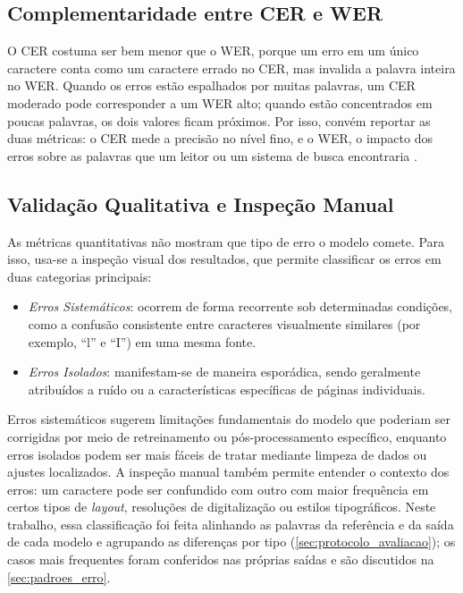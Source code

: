 \documentclass[noabntexcite,oneside]{ufsc-thesis-rn46-2019}
\begin{document}
\subsection{Complementaridade entre CER e WER}

O CER costuma ser bem menor que o WER, porque um erro em um único caractere conta como um
caractere errado no CER, mas invalida a palavra inteira no WER. Quando os erros estão
espalhados por muitas palavras, um CER moderado pode corresponder a um WER alto; quando
estão concentrados em poucas palavras, os dois valores ficam próximos. Por isso, convém
reportar as duas métricas: o CER mede a precisão no nível fino, e o WER, o impacto dos
erros sobre as palavras que um leitor ou um sistema de busca encontraria
\cite{neudecker2021}.

\subsection{Validação Qualitativa e Inspeção Manual}

As métricas quantitativas não mostram que tipo de erro o modelo comete. Para isso,
usa-se a inspeção visual dos resultados, que permite classificar os erros em duas
categorias principais:

\begin{itemize}
    \item \textit{Erros Sistemáticos}: ocorrem de forma recorrente sob determinadas
    condições, como a confusão consistente entre caracteres visualmente similares (por
    exemplo, ``l'' e ``I'') em uma mesma fonte.

    \item \textit{Erros Isolados}: manifestam-se de maneira esporádica, sendo geralmente
    atribuídos a ruído ou a características específicas de páginas individuais.
\end{itemize}

Erros sistemáticos sugerem limitações fundamentais do modelo que poderiam ser corrigidas
por meio de retreinamento ou pós-processamento específico, enquanto erros isolados podem
ser mais fáceis de tratar mediante limpeza de dados ou ajustes localizados. A inspeção
manual também permite entender o contexto dos erros: um caractere pode ser confundido com
outro com maior frequência em certos tipos de \textit{layout}, resoluções de digitalização
ou estilos tipográficos. Neste trabalho, essa classificação foi feita alinhando as palavras
da referência e da saída de cada modelo e agrupando as diferenças por tipo
(\autoref{sec:protocolo_avaliacao}); os casos mais frequentes foram conferidos nas próprias
saídas e são discutidos na \autoref{sec:padroes_erro}.
\end{document}

